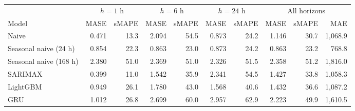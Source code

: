 \begin{tabular}{l rr rr rr rrr}
\toprule
 & \multicolumn{2}{c}{$h=1$ h} & \multicolumn{2}{c}{$h=6$ h} & \multicolumn{2}{c}{$h=24$ h} & \multicolumn{3}{c}{All horizons} \\
\cmidrule(lr){2-3}\cmidrule(lr){4-5}\cmidrule(lr){6-7}\cmidrule(lr){8-10}
Model & MASE & sMAPE & MASE & sMAPE & MASE & sMAPE & MASE & sMAPE & MAE \\
\midrule
Naive & 0.471 & 13.3 & 2.094 & 54.5 & 0.873 & 24.2 & 1.146 & 30.7 & 1,068.9 \\
Seasonal naive (24 h) & 0.854 & 22.3 & 0.863 & 23.0 & 0.873 & 24.2 & 0.863 & 23.2 & 768.8 \\
Seasonal naive (168 h) & 2.380 & 51.0 & 2.369 & 51.0 & 2.326 & 51.5 & 2.358 & 51.2 & 1,816.0 \\
SARIMAX & 0.399 & 11.0 & 1.542 & 35.9 & 2.341 & 54.5 & 1.427 & 33.8 & 1,058.3 \\
LightGBM & 0.949 & 26.1 & 1.780 & 43.0 & 1.568 & 40.6 & 1.432 & 36.6 & 1,087.2 \\
GRU & 1.012 & 26.8 & 2.699 & 60.0 & 2.957 & 62.9 & 2.223 & 49.9 & 1,610.5 \\
\bottomrule
\end{tabular}
